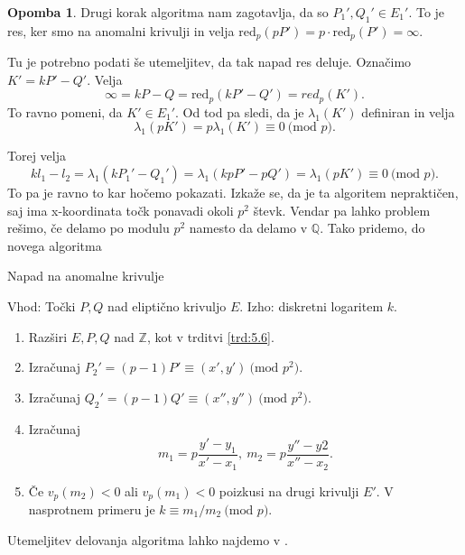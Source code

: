 \documentclass[12pt,a4paper,twoside]{article}
\theoremstyle{definition} %
\newtheorem{opomba}[definicija]{Opomba}
\theoremstyle{plain} %
\numberwithin{equation}{section}  %
\newcommand{\Z}{\mathbb Z}
\newcommand{\Q}{\mathbb Q}
\newcommand{\MOD}[1]{\ \text{(mod }{#1}\text{)}}
\begin{document}
\begin{opomba}
Drugi korak algoritma nam zagotavlja, da so $P_1',Q_1' \in E_1'$. To je res, ker smo na anomalni krivulji in velja $\text{red}_p(pP') = p\cdot \text{red}_p(P') = \infty$.
\end{opomba}

Tu je potrebno podati še utemeljitev, da tak napad res deluje. Označimo $K' = kP'-Q'$.
Velja
$$\infty = kP-Q = \text{red}_p(kP'-Q') = red_p(K').$$
To ravno pomeni, da $K' \in E_1'$. Od tod pa sledi, da je $\lambda_1(K')$ definiran in velja
$$\lambda_1(pK') = p \lambda_1(K') \equiv 0 \MOD{p}.$$

Torej velja
$$kl_1-l_2 = \lambda_1(kP_1'-Q_1') = \lambda_1(kpP'-pQ') = \lambda_1(pK') \equiv 0 \MOD{p}.$$
To pa je ravno to kar hočemo pokazati.
Izkaže se, da je ta algoritem nepraktičen, saj ima x-koordinata točk ponavadi okoli $p^2$ števk.
Vendar pa lahko problem rešimo, če delamo po modulu $p^2$ namesto da delamo v $\Q$.
Tako pridemo, do novega algoritma

\begin{algorithm}[H]
\caption[ANC]{Napad na anomalne krivulje}
\label{alg:AnomalAttack}
Vhod: Točki $P, Q$ nad eliptično krivuljo $E$.\newline
Izho: diskretni logaritem $k$.\newline
\begin{enumerate}
\item Razširi $E,P,Q$ nad $\Z$, kot v trditvi \ref{trd:5.6}.
\item Izračunaj $P_2' = (p-1)P' \equiv (x',y') \MOD{p^2}$.
\item Izračunaj $Q_2' = (p-1)Q' \equiv(x'',y'') \MOD{p^2}$.
\item Izračunaj
$$m_1 = p\frac{y'-y_1}{x'-x_1}, \ m_2 = p\frac{y''-y2}{x''-x_2}.$$
\item Če $v_p(m_2) <0$ ali $v_p(m_1)<0$ poizkusi na drugi krivulji $E'$. V nasprotnem primeru je $k \equiv m_1/m_2 \MOD{p}$.
\end{enumerate}

\end{algorithm}

Utemeljitev delovanja algoritma lahko najdemo v \cite{Washington2008}.
\end{document}
